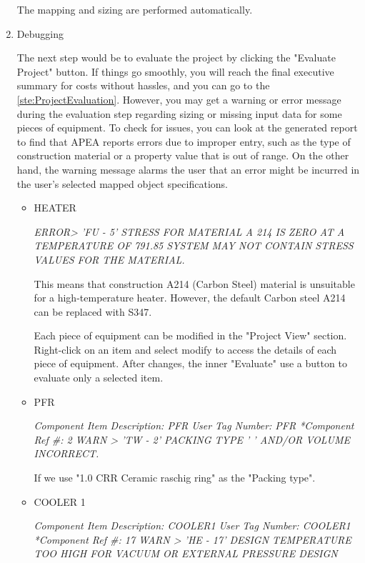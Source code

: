 \begin{enumerate}[label=\textbf{Step \arabic{enumi}}:,ref=Step \arabic{enumi}]
	The mapping and sizing are performed automatically.
	
	\item Debugging 
	
	The next step would be to evaluate the project by clicking the "Evaluate Project" button. If things go smoothly, you will reach the final executive summary for costs without hassles, and you can go to the \ref{ste:ProjectEvaluation}. However, you may get a warning or error message during the evaluation step regarding sizing or missing input data for some pieces of equipment. To check for issues, you can look at the generated report to find that APEA reports errors due to improper entry, such as the type of construction material or a property value that is out of range. On the other hand, the warning message alarms the user that an error might be incurred in the user's selected mapped object specifications.
	
	\begin{itemize}
		\item HEATER
		
		\textit{ERROR> 'FU -    5' STRESS FOR MATERIAL A 214   IS ZERO AT A TEMPERATURE OF  791.85 SYSTEM MAY NOT CONTAIN STRESS VALUES FOR THE MATERIAL.}
		
		This means that construction A214 (Carbon Steel) material is unsuitable for a high-temperature heater. However, the default Carbon steel A214 can be replaced with S347.
		
		Each piece of equipment can be modified in the "Project View" section. Right-click on an item and select modify to access the details of each piece of equipment. After changes, the inner "Evaluate" use a button to evaluate only a selected item. \\
		
		\item PFR
		
		\textit{Component Item Description: PFR
			User Tag Number: PFR
			*Component Ref \#: 2
			WARN > 'TW -    2' PACKING TYPE '      ' AND/OR VOLUME INCORRECT.}
		
		If we use "1.0 CRR Ceramic raschig ring" as the "Packing type". \\
		
		\item COOLER 1
		
		\textit{Component Item Description: COOLER1
			User Tag Number: COOLER1
			*Component Ref \#: 17
			WARN > 'HE -   17' DESIGN TEMPERATURE TOO HIGH FOR VACUUM OR EXTERNAL PRESSURE DESIGN}
		

\end{itemize}
\end{enumerate}
